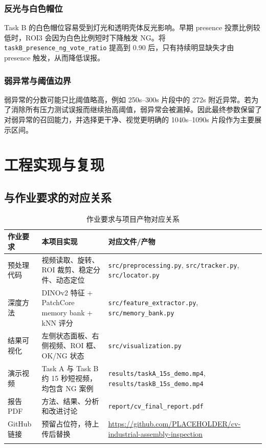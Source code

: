 \documentclass[12pt,hyperref,a4paper,UTF8,fontset=fandol]{ctexart}
\begin{document}
\subsubsection{反光与白色帽位}

Task B 的白色帽位容易受到灯光和透明壳体反光影响。早期 presence 投票比例较低时，ROI3 会因为白色比例短时下降触发 NG。将 \texttt{taskB\_presence\_ng\_vote\_ratio} 提高到 0.90 后，只有持续明显缺失才由 presence 触发，从而降低误报。

\subsubsection{弱异常与阈值边界}

弱异常的分数可能只比阈值略高，例如 250s--300s 片段中的 272s 附近异常。若为了消除所有压力测试误报而继续抬高阈值，弱异常会被漏掉。因此最终参数保留了对弱异常的召回能力，并选择更干净、视觉更明确的 1040s--1090s 片段作为主要展示区间。

\newpage
\section{工程实现与复现}

\subsection{与作业要求的对应关系}

\begin{longtable}{p{}p{}p{}}
\toprule
作业要求 & 本项目实现 & 对应文件/产物 \\
\midrule
预处理代码 & 视频读取、旋转、ROI 裁剪、稳定分件、动态定位 & \texttt{src/preprocessing.py}, \texttt{src/tracker.py}, \texttt{src/locator.py} \\
深度方法 & DINOv2 特征 + PatchCore memory bank + kNN 评分 & \texttt{src/feature\_extractor.py}, \texttt{src/memory\_bank.py} \\
结果可视化 & 左侧状态面板、右侧视频、ROI 框、OK/NG 状态 & \texttt{src/visualization.py} \\
演示视频 & Task A 与 Task B 约 15 秒短视频，均包含 NG 案例 & \texttt{results/taskA\_15s\_demo.mp4}, \texttt{results/taskB\_15s\_demo.mp4} \\
报告 PDF & 方法、结果、分析和改进讨论 & \texttt{report/cv\_final\_report.pdf} \\
GitHub 链接 & 预留占位符，待上传后替换 & \url{https://github.com/PLACEHOLDER/cv-industrial-assembly-inspection} \\
\bottomrule
\caption{作业要求与项目产物对应关系}
\end{longtable}
\end{document}
